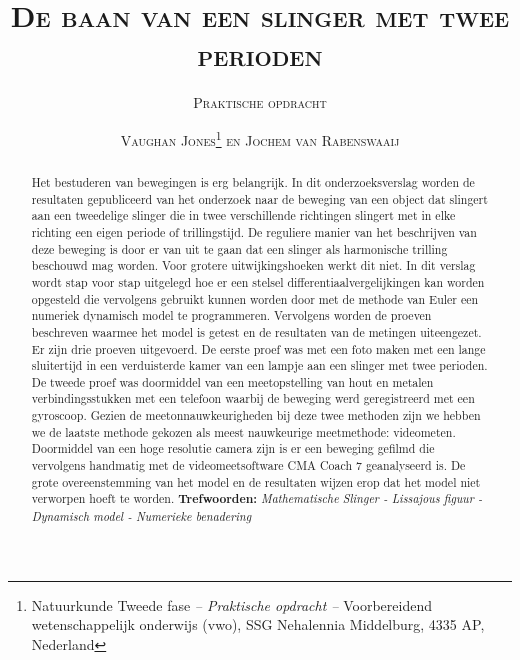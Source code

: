 \documentclass[a4paper]{article}
\title{\textsc{De baan van een slinger met twee perioden}}
\subtitle{\textsc{Praktische opdracht}}
\author{\textsc{Vaughan Jones\thanks{Natuurkunde Tweede fase \textit{– Praktische opdracht –} Voorbereidend wetenschappelijk onderwijs (vwo), SSG Nehalennia Middelburg, 4335 AP, Nederland} \space en Jochem van Rabenswaaij\footnotemark[1]{}}}
\begin{document}
	
	
	\maketitle
	\begin{abstract}
		\noindent Het bestuderen van bewegingen is erg belangrijk. In dit onderzoeksverslag worden de resultaten gepubliceerd van het onderzoek naar de beweging van een object dat slingert aan een tweedelige slinger die in twee verschillende richtingen slingert met in elke richting een eigen periode of trillingstijd. De reguliere manier van het beschrijven van deze beweging is door er van uit te gaan dat een slinger als harmonische trilling beschouwd mag worden. Voor grotere uitwijkingshoeken werkt dit niet. In dit verslag wordt stap voor stap uitgelegd hoe er een stelsel differentiaalvergelijkingen kan worden opgesteld die vervolgens gebruikt kunnen worden door met de methode van Euler een numeriek dynamisch model te programmeren. Vervolgens worden de proeven beschreven waarmee het model is getest en de resultaten van de metingen uiteengezet. Er zijn drie proeven uitgevoerd. De eerste proef was met een foto maken met een lange sluitertijd in een verduisterde kamer van een lampje aan een slinger met twee perioden. De tweede proef was doormiddel van een meetopstelling van hout en metalen verbindingsstukken met een telefoon waarbij de beweging werd geregistreerd met een gyroscoop. Gezien de meetonnauwkeurigheden bij deze twee methoden zijn we hebben we de laatste methode gekozen als meest nauwkeurige meetmethode: videometen. Doormiddel van een hoge resolutie camera zijn is er een beweging gefilmd die vervolgens handmatig met de videomeetsoftware CMA Coach 7 geanalyseerd is. De grote overeenstemming van het model en de resultaten wijzen erop dat het model niet verworpen hoeft te worden.
		\newline
		\newline
		\noindent \textbf{Trefwoorden:} \textit{Mathematische Slinger - Lissajous figuur - Dynamisch model - Numerieke benadering}
		
		
	\end{abstract}
	
	\clearpage
	\tableofcontents
	
	\clearpage
\end{document}
